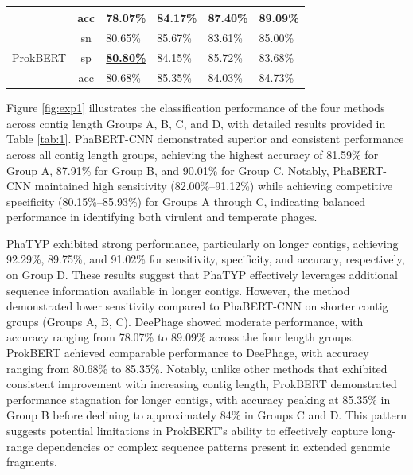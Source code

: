 \documentclass[runningheads]{llncs}
\begin{document}
\begin{table}[]
{\begin{tabular}{rcllll}
                             & acc & 78.07\%                & 84.17\%                & 87.40\%                & 89.09\%                \\ \hline
\multirow{3}{*}{ProkBERT}    & sn  & 80.65\%                & 85.67\%                & 83.61\%                & 85.00\%                \\
                             & sp  & {\ul \textbf{80.80\%}} & 84.15\%                & 85.72\%                & 83.68\%                \\
                             & acc & 80.68\%                & 85.35\%                & 84.03\%                & 84.73\%                \\ \hline
\end{tabular}%
}
\end{table}

Figure \ref{fig:exp1} illustrates the classification performance of the four methods across contig length Groups A, B, C, and D, with detailed results provided in Table \ref{tab:1}. PhaBERT-CNN demonstrated superior and consistent performance across all contig length groups, achieving the highest accuracy of 81.59\% for Group A, 87.91\% for Group B, and 90.01\% for Group C. Notably, PhaBERT-CNN maintained high sensitivity (82.00\%--91.12\%) while achieving competitive specificity (80.15\%--85.93\%) for Groups A through C, indicating balanced performance in identifying both virulent and temperate phages.

PhaTYP exhibited strong performance, particularly on longer contigs\cite{shang2023phatyp}, achieving 92.29\%, 89.75\%, and 91.02\% for sensitivity, specificity, and accuracy, respectively, on Group D. These results suggest that PhaTYP effectively leverages additional sequence information available in longer contigs. However, the method demonstrated lower sensitivity compared to PhaBERT-CNN on shorter contig groups (Groups A, B, C). DeePhage showed moderate performance\cite{wu2021deephage}, with accuracy ranging from 78.07\% to 89.09\% across the four length groups. ProkBERT achieved comparable performance to DeePhage, with accuracy ranging from 80.68\% to 85.35\%. Notably, unlike other methods that exhibited consistent improvement with increasing contig length, ProkBERT demonstrated performance stagnation for longer contigs, with accuracy peaking at 85.35\% in Group B before declining to approximately 84\% in Groups C and D. This pattern suggests potential limitations in ProkBERT's ability to effectively capture long-range dependencies or complex sequence patterns present in extended genomic fragments.
\end{document}
